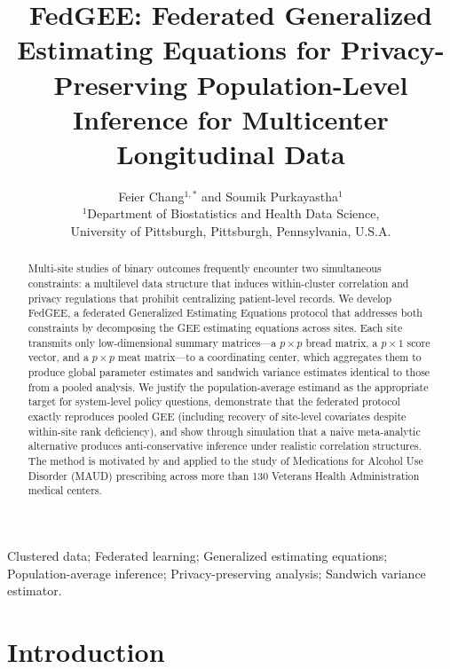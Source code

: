 \documentclass[useAMS,referee]{biom}
\title[FedGEE: Federated GEE for Privacy-Preserving Inference]{FedGEE: Federated Generalized Estimating Equations for Privacy-Preserving Population-Level Inference for Multicenter Longitudinal Data}
\author
{Feier Chang$^{1,*}$\email{fec54@pitt.edu} and
Soumik Purkayastha$^{1}$ \\
$^{1}$Department of Biostatistics and Health Data Science, \\University of Pittsburgh,
Pittsburgh, Pennsylvania, U.S.A.}
\begin{document}
\date{}

\pagerange{\pageref{firstpage}--\pageref{lastpage}}

\label{firstpage}

\begin{abstract}
Multi-site studies of binary outcomes frequently encounter two simultaneous constraints: a multilevel data structure that induces within-cluster correlation and privacy regulations that prohibit centralizing patient-level records. We develop FedGEE, a federated Generalized Estimating Equations protocol that addresses both constraints by decomposing the GEE estimating equations across sites. Each site transmits only low-dimensional summary matrices---a $p \times p$ bread matrix, a $p \times 1$ score vector, and a $p \times p$ meat matrix---to a coordinating center, which aggregates them to produce global parameter estimates and sandwich variance estimates identical to those from a pooled analysis. We justify the population-average estimand as the appropriate target for system-level policy questions, demonstrate that the federated protocol exactly reproduces pooled GEE (including recovery of site-level covariates despite within-site rank deficiency), and show through simulation that a naive meta-analytic alternative produces anti-conservative inference under realistic correlation structures. The method is motivated by and applied to the study of Medications for Alcohol Use Disorder (MAUD) prescribing across more than 130 Veterans Health Administration medical centers.
\end{abstract}

\begin{keywords}
Clustered data; Federated learning; Generalized estimating equations; Population-average inference; Privacy-preserving analysis; Sandwich variance estimator.
\end{keywords}

\maketitle

\section{Introduction}
\label{s:intro}
\end{document}

